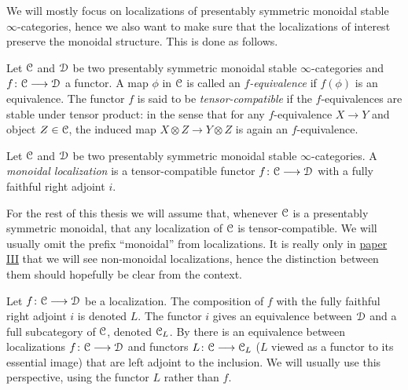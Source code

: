 We will mostly focus on localizations of presentably symmetric monoidal stable $\infty$-categories, hence we also want to make sure that the localizations of interest preserve the monoidal structure. This is done as follows. 

\begin{definition}
    \label{ch0:def:L-equivalence}
    Let $\EuScript{C}$ and $\EuScript{D}$ be two presentably symmetric monoidal stable $\infty$-categories and $f\colon \EuScript{C}\longrightarrow \EuScript{D}$ a functor. A map $\phi$ in $\EuScript{C}$ is called an \emph{$f$-equivalence} if $f(\phi)$ is an equivalence. The functor $f$ is said to be \emph{tensor-compatible} if the $f$-equivalences are stable under tensor product: in the sense that for any $f$-equivalence $X\longrightarrow Y$ and object $Z\in \EuScript{C}$, the induced map $X\otimes Z\longrightarrow Y\otimes Z$ is again an $f$-equivalence. 
\end{definition}

\begin{definition}
    \label{ch0:def:monoidal-localization}
    Let $\EuScript{C}$ and $\EuScript{D}$ be two presentably symmetric monoidal stable $\infty$-categories. A \emph{monoidal localization} is a tensor-compatible functor $f\colon \EuScript{C}\longrightarrow \EuScript{D}$ with a fully faithful right adjoint $i$. 
\end{definition}

\begin{remark}
    \label{ch0:rm:localizations-tensor-compatible}
    For the rest of this thesis we will assume that, whenever $\EuScript{C}$ is a presentably symmetric monoidal, that any localization of $\EuScript{C}$ is tensor-compatible. We will usually omit the prefix ``monoidal'' from localizations. It is really only in \hyperref[ch3]{paper III} that we will see non-monoidal localizations, hence the distinction between them should hopefully be clear from the context.
\end{remark}

\begin{remark}
    Let $f\colon \EuScript{C}\longrightarrow \EuScript{D}$ be a localization. The composition of $f$ with the fully faithful right adjoint $i$ is denoted $L$. The functor $i$ gives an equivalence between $\EuScript{D}$ and a full subcategory of $\EuScript{C}$, denoted $\EuScript{C}_L$. By \cite[5.2.7.4]{lurie_09} there is an equivalence between localizations $f\colon \EuScript{C}\longrightarrow \EuScript{D}$ and functors $L\colon \EuScript{C}\longrightarrow \EuScript{C}_L$ ($L$ viewed as a functor to its essential image) that are left adjoint to the inclusion. We will usually use this perspective, using the functor $L$ rather than $f$. 
\end{remark}

